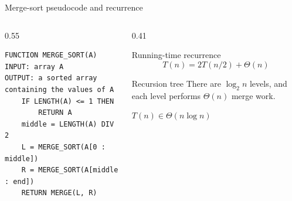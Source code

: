 \documentclass[aspectratio=169]{beamer}
\begin{document}
\begin{frame}[fragile]{Merge-sort pseudocode and recurrence}
  \begin{columns}[T]
    \begin{column}{0.55\textwidth}
\begin{lstlisting}[style=pseudonumbered]
FUNCTION MERGE_SORT(A)
INPUT: array A
OUTPUT: a sorted array containing the values of A
    IF LENGTH(A) <= 1 THEN
        RETURN A
    middle = LENGTH(A) DIV 2
    L = MERGE_SORT(A[0 : middle])
    R = MERGE_SORT(A[middle : end])
    RETURN MERGE(L, R)
\end{lstlisting}
    \end{column}
    \begin{column}{0.41\textwidth}
      \begin{block}{Running-time recurrence}
        \[
          T(n)=2T(n/2)+\Theta(n)
        \]
      \end{block}
      \begin{exampleblock}{Recursion tree}
        There are $\log_2 n$ levels, and each level performs $\Theta(n)$ merge
        work.
      \end{exampleblock}
      \centering
      $T(n)\in\Theta(n\log n)$
    \end{column}
  \end{columns}
\end{frame}
\end{document}

